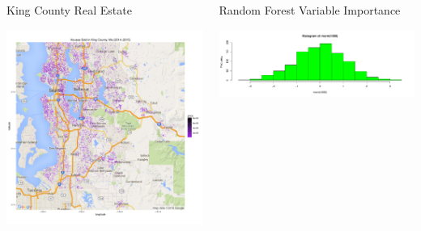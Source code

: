 \documentclass[final]{beamer}\usepackage[]{graphicx}\usepackage[]{color}
\makeatletter
\def\maxwidth{ %
  \ifdim\Gin@nat@width>\linewidth
    \linewidth
  \else
    \Gin@nat@width
  \fi
}
\newenvironment{knitrout}{}{} %
\makeatother
\begin{document}
\begin{frame}[fragile]
\begin{columns}[t]
\begin{column}{0.31\linewidth}
\begin{minipage}[t][.955\textheight]{\linewidth}
\begin{block}{King County Real Estate}
\begin{knitrout}
{\centering \includegraphics[width=\maxwidth]{figure/KCmap-1} 

}



\end{knitrout}
\vspace{0ex}
\end{block}
\vfill

\end{minipage}
\end{column}%

\begin{column}{0.31\linewidth}
\begin{minipage}[t][.955\textheight]{\linewidth} 

\vspace{0ex}
\begin{block}{Random Forest Variable Importance}
\vspace{0ex}
\begin{knitrout}
\color{fgcolor}

{\centering \includegraphics[width=\maxwidth]{figure/HIST2-1} 

}
\end{knitrout}
\end{block}
\end{minipage}
\end{column}
\end{columns}
\end{frame}
\end{document}
